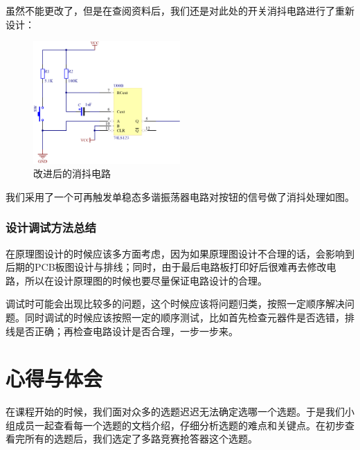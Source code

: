 \documentclass{../source/Experiment}
\begin{document}
            虽然不能更改了，但是在查阅资料后，我们还是对此处的开关消抖电路进行了重新设计：
            \begin{figure}[H]
                \centering
                \includegraphics[width = 0.5\textwidth]{pic/消抖.png}
                \caption{改进后的消抖电路}
            \end{figure}
            我们采用了一个可再触发单稳态多谐振荡器电路对按钮的信号做了消抖处理如图。
            \subsubsection{设计调试方法总结}
            在原理图设计的时候应该多方面考虑，因为如果原理图设计不合理的话，会影响到后期的PCB板图设计与排线；同时，由于最后电路板打印好后很难再去修改电路，所以在设计原理图的时候也要尽量保证电路设计的合理。
            
            调试时可能会出现比较多的问题，这个时候应该将问题归类，按照一定顺序解决问题。同时调试的时候应该按照一定的顺序测试，比如首先检查元器件是否选错，排线是否正确；再检查电路设计是否合理，一步一步来。
    \section{心得与体会}
        在课程开始的时候，我们面对众多的选题迟迟无法确定选哪一个选题。于是我们小组成员一起查看每一个选题的文档介绍，仔细分析选题的难点和关键点。在初步查看完所有的选题后，我们选定了多路竞赛抢答器这个选题。

        
\end{document}
